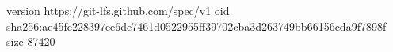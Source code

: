 version https://git-lfs.github.com/spec/v1
oid sha256:ae45fc228397ee6de7461d0522955ff39702cba3d263749bb66156cda9f7898f
size 87420
